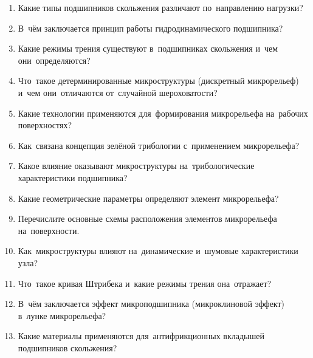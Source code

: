 \begin{enumerate}
\item Какие типы подшипников скольжения различают по~направлению нагрузки?
\item В~чём заключается принцип работы гидродинамического подшипника?
\item Какие режимы трения существуют в~подшипниках скольжения и~чем они~определяются?
\item Что~такое детерминированные микроструктуры (дискретный микрорельеф) и~чем они~отличаются от~случайной шероховатости?
\item Какие технологии применяются для~формирования микрорельефа на~рабочих поверхностях?
\item Как~связана концепция зелёной трибологии с~применением микрорельефа?
\item Какое влияние оказывают микроструктуры на~трибологические характеристики подшипника?
\item Какие геометрические параметры определяют элемент микрорельефа?
\item Перечислите основные схемы расположения элементов микрорельефа на~поверхности.
\item Как~микроструктуры влияют на~динамические и~шумовые характеристики узла?
\item Что~такое кривая Штрибека и~какие режимы трения она~отражает?
\item В~чём заключается эффект микроподшипника (микроклиновой эффект) в~лунке микрорельефа?
\item Какие материалы применяются для~антифрикционных вкладышей подшипников скольжения?
\end{enumerate}